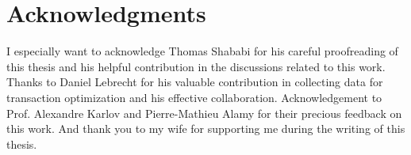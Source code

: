 \chapter*{Acknowledgments}

I especially want to acknowledge Thomas Shababi for his careful proofreading of
this thesis and his helpful contribution in the discussions related to this
work. Thanks to Daniel Lebrecht for his valuable contribution in collecting data
for transaction optimization and his effective collaboration. Acknowledgement to
Prof. Alexandre Karlov and Pierre-Mathieu Alamy for their precious feedback on
this work. And thank you to my wife for supporting me during the writing of this
thesis.
